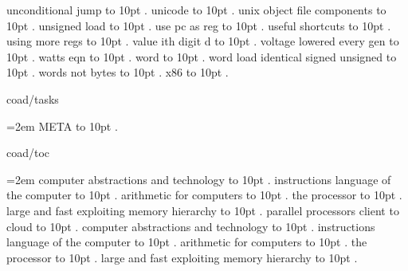 unconditional jump \leaders\hbox to 10pt {\hss.\hss}  \hfill {}
\smallskip
unicode \leaders\hbox to 10pt {\hss.\hss}  \hfill {}
\smallskip
unix object file components \leaders\hbox to 10pt {\hss.\hss}  \hfill {}
\smallskip
unsigned load \leaders\hbox to 10pt {\hss.\hss}  \hfill {}
\smallskip
use pc as reg \leaders\hbox to 10pt {\hss.\hss}  \hfill {}
\smallskip
useful shortcuts \leaders\hbox to 10pt {\hss.\hss}  \hfill {}
\smallskip
using more regs \leaders\hbox to 10pt {\hss.\hss}  \hfill {}
\smallskip
value ith digit d \leaders\hbox to 10pt {\hss.\hss}  \hfill {}
\smallskip
voltage lowered every gen \leaders\hbox to 10pt {\hss.\hss}  \hfill {}
\smallskip
watts eqn \leaders\hbox to 10pt {\hss.\hss}  \hfill {}
\smallskip
word \leaders\hbox to 10pt {\hss.\hss}  \hfill {}
\smallskip
word load identical signed unsigned \leaders\hbox to 10pt {\hss.\hss}  \hfill {}
\smallskip
words not bytes \leaders\hbox to 10pt {\hss.\hss}  \hfill {}
\smallskip
x86 \leaders\hbox to 10pt {\hss.\hss}  \hfill {}
\smallskip
\par\endgroup
\bigskip
{}
coad/tasks
\par\begingroup
\leftskip=2em
\smallskip
META \leaders\hbox to 10pt {\hss.\hss}  \hfill {}
\smallskip
\medskip
\par\endgroup
\bigskip
{}
coad/toc
\par\begingroup
\leftskip=2em
 computer abstractions and technology \leaders\hbox to 10pt {\hss.\hss}  \hfill {}
 instructions language of the computer \leaders\hbox to 10pt {\hss.\hss}  \hfill {}
 arithmetic for computers \leaders\hbox to 10pt {\hss.\hss}  \hfill {}
 the processor \leaders\hbox to 10pt {\hss.\hss}  \hfill {}
 large and fast exploiting memory hierarchy \leaders\hbox to 10pt {\hss.\hss}  \hfill {}
 parallel processors client to cloud \leaders\hbox to 10pt {\hss.\hss}  \hfill {}
\smallskip
{} computer abstractions and technology \leaders\hbox to 10pt {\hss.\hss}  \hfill {}
 instructions language of the computer \leaders\hbox to 10pt {\hss.\hss}  \hfill {}
 arithmetic for computers \leaders\hbox to 10pt {\hss.\hss}  \hfill {}
 the processor \leaders\hbox to 10pt {\hss.\hss}  \hfill {}
 large and fast exploiting memory hierarchy \leaders\hbox to 10pt {\hss.\hss}  \hfill {}
